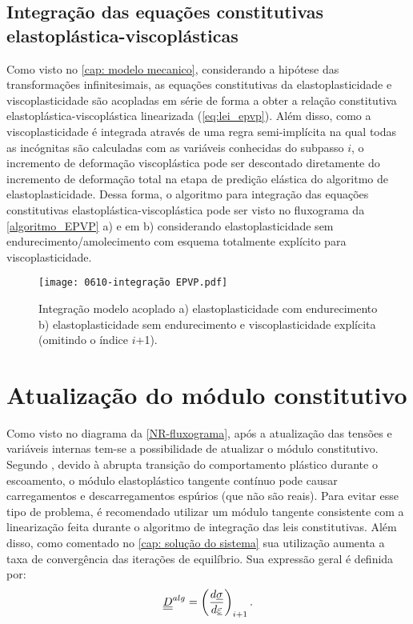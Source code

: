 \subsection{Integração das equações constitutivas elastoplástica-viscoplásticas}
Como visto no \autoref{cap: modelo mecanico}, considerando a hipótese das transformações infinitesimais, as equações constitutivas da elastoplasticidade e viscoplasticidade são acopladas em série de forma a obter a relação constitutiva elastoplástica-viscoplástica linearizada (\ref{eq:lei_epvp}). Além disso, como a viscoplasticidade é integrada através de uma regra semi-implícita na qual todas as incógnitas são calculadas com as variáveis conhecidas do subpasso $i$, o incremento de deformação viscoplástica pode ser descontado diretamente do incremento de deformação total na etapa de predição elástica do algoritmo de elastoplasticidade. Dessa forma, o algoritmo para integração das equações constitutivas elastoplástica-viscoplástica pode ser visto no fluxograma da \autoref{algoritmo_EPVP} a) e em b) considerando elastoplasticidade sem endurecimento/amolecimento com esquema totalmente explícito para viscoplasticidade.
\begin{figure}[H]
	\begin{center}
		\texttt{[image: 0610-integração EPVP.pdf]}
	\end{center}
	\caption{\label{algoritmo_EPVP}Integração modelo acoplado a) elastoplasticidade com endurecimento b) elastoplasticidade sem endurecimento e viscoplasticidade explícita (omitindo o índice $i$+1).}
\end{figure}

\section{Atualização do módulo constitutivo}

Como visto no diagrama da \autoref{NR-fluxograma}, após a atualização das tensões e variáveis internas tem-se a possibilidade de atualizar o módulo constitutivo. Segundo , devido à abrupta transição do comportamento plástico durante o escoamento, o módulo elastoplástico tangente contínuo pode causar carregamentos e descarregamentos espúrios (que não são reais). Para evitar esse tipo de problema, é recomendado utilizar um módulo tangente consistente com a linearização feita durante o algoritmo de integração das leis constitutivas. Além disso, como comentado no \autoref{cap: solução do sistema} sua utilização aumenta a taxa de convergência das iterações de equilíbrio. Sua expressão geral é definida por:
\begin{equation}
	\label{eq:D_alg1}
	\underline{\underline D}^{alg} = \left(\dfrac{d\underline \sigma}{d\underline{\varepsilon}} \right)_{i+1}.
\end{equation}

